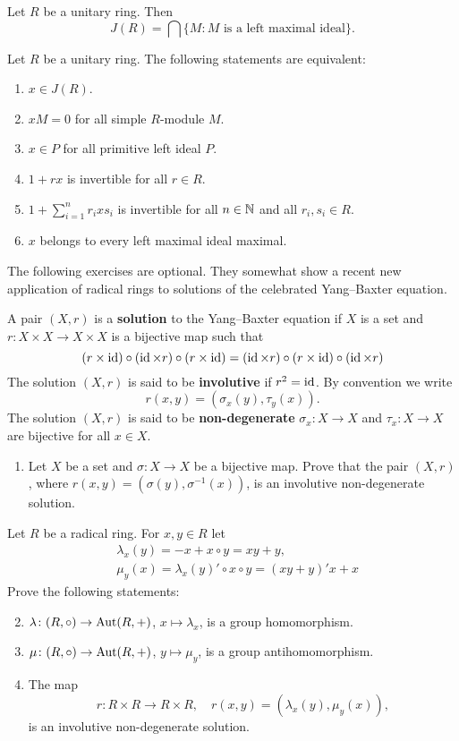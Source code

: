 \begin{exercise}
	Let $R$ be a unitary ring. Then  
	\[
	J(R)=\bigcap\{M:\text{$M$ is a left maximal ideal}\}.
	\]
\end{exercise}

\begin{exercise}
	Let $R$ be a unitary ring. The
	following statements are equivalent: 
	\begin{enumerate}
		\item $x\in J(R)$.
		\item $xM=0$ for all simple $R$-module $M$.
		\item $x\in P$ for all primitive left ideal $P$.
		\item $1+rx$ is invertible for all $r\in R$.
		\item $1+\sum_{i=1}^n r_ixs_i$ is invertible for all $n\in\mathbb{N}$ and all $r_i,s_i\in R$.
		\item $x$ belongs to every left maximal ideal maximal. 
	\end{enumerate}
\end{exercise}

The following exercises are optional. They somewhat show a recent new application of radical rings
to solutions of the celebrated Yang--Baxter equation. 

\begin{exercise}
A pair $(X,r)$ is a \textbf{solution} to the 
Yang--Baxter equation if $X$ is a set and
$r\colon X\times X\to X\times X$ is a bijective map such that  
\[
	(r\times\operatorname{id})\circ (\operatorname{id}\times r)\circ (r\times\operatorname{id})
	=(\operatorname{id}\times r)\circ (r\times\operatorname{id})\circ (\operatorname{id}\times r)
\]
The solution $(X,r)$ is said to be \textbf{involutive} 
if $r^2=\operatorname{id}$. By convention we write 
\[
	r(x,y)=(\sigma_x(y),\tau_y(x)).
\]
The solution $(X,r)$ is said to be \textbf{non-degenerate}  
$\sigma_x\colon X\to X$ and 
$\tau_x\colon X\to X$ are bijective for all $x\in X$.

\begin{enumerate}
    \item Let $X$ be a set and $\sigma\colon X\to X$ be a bijective map. Prove that  
          the pair $(X,r)$, where 
          $r(x,y)=(\sigma(y),\sigma^{-1}(x))$, is an involutive non-degenerate solution. 
\end{enumerate}
Let $R$ be a radical ring. For $x,y\in R$ let 
\begin{align*}
	&\lambda_x(y)=-x+x\circ y=xy+y,\\
	&\mu_y(x)=\lambda_x(y)'\circ x\circ y=(xy+y)'x+x
\end{align*}
Prove the following statements:
\begin{enumerate}
    \setcounter{enumi}{1}
		\item $\lambda\colon (R,\circ)\to\operatorname{Aut}(R,+)$, $x\mapsto
			\lambda_x$, is a group homomorphism.
		\item $\mu\colon (R,\circ)\to\operatorname{Aut}(R,+)$, $y\mapsto\mu_y$,
    		is a group antihomomorphism.
	    \item The map 
    	\[
	        r\colon R\times R\to R\times R,\quad
	        r(x,y)=(\lambda_x(y),\mu_y(x)),
	    \]
	is an involutive non-degenerate solution. 
\end{enumerate}
\end{exercise}

